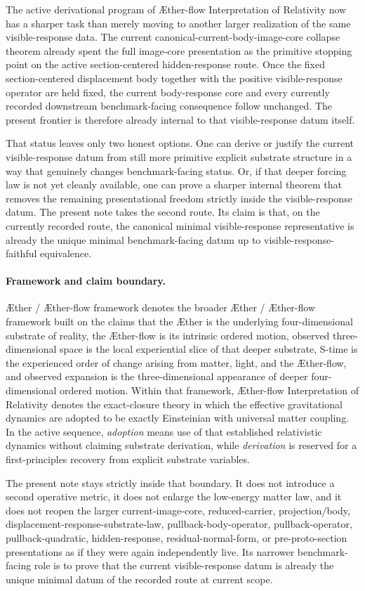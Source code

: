 \documentclass[11pt]{article}
\newcommand{\Aether}{\AE{}ther}
\newcommand{\Aflow}{\AE{}ther-flow}
\newcommand{\TheoryName}{\Aflow{} Interpretation of Relativity}
\newcommand{\TheoryProgram}{\Aether{} / \Aflow{} framework}
\begin{document}
The active derivational program of \TheoryName{} now has a sharper task than merely moving to another larger realization of the same visible-response data. The current canonical-current-body-image-core collapse theorem already spent the full image-core presentation as the primitive stopping point on the active section-centered hidden-response route. Once the fixed section-centered displacement body together with the positive visible-response operator are held fixed, the current body-response core and every currently recorded downstream benchmark-facing consequence follow unchanged. The present frontier is therefore already internal to that visible-response datum itself.

That status leaves only two honest options. One can derive or justify the current visible-response datum from still more primitive explicit substrate structure in a way that genuinely changes benchmark-facing status. Or, if that deeper forcing law is not yet cleanly available, one can prove a sharper internal theorem that removes the remaining presentational freedom strictly inside the visible-response datum. The present note takes the second route. Its claim is that, on the currently recorded route, the canonical minimal visible-response representative is already the unique minimal benchmark-facing datum up to visible-response-faithful equivalence.

\paragraph{Framework and claim boundary.}
\TheoryProgram{} denotes the broader \Aether{} / \Aflow{} framework built on the claims that the \Aether{} is the underlying four-dimensional substrate of reality, the \Aflow{} is its intrinsic ordered motion, observed three-dimensional space is the local experiential slice of that deeper substrate, S-time is the experienced order of change arising from matter, light, and the \Aflow{}, and observed expansion is the three-dimensional appearance of deeper four-dimensional ordered motion. Within that framework, \TheoryName{} denotes the exact-closure theory in which the effective gravitational dynamics are adopted to be exactly Einsteinian with universal matter coupling. In the active sequence, \emph{adoption} means use of that established relativistic dynamics without claiming substrate derivation, while \emph{derivation} is reserved for a first-principles recovery from explicit substrate variables.

The present note stays strictly inside that boundary. It does not introduce a second operative metric, it does not enlarge the low-energy matter law, and it does not reopen the larger current-image-core, reduced-carrier, projection/body, displacement-response-substrate-law, pullback-body-operator, pullback-operator, pullback-quadratic, hidden-response, residual-normal-form, or pre-proto-section presentations as if they were again independently live. Its narrower benchmark-facing role is to prove that the current visible-response datum is already the unique minimal datum of the recorded route at current scope.
\end{document}
